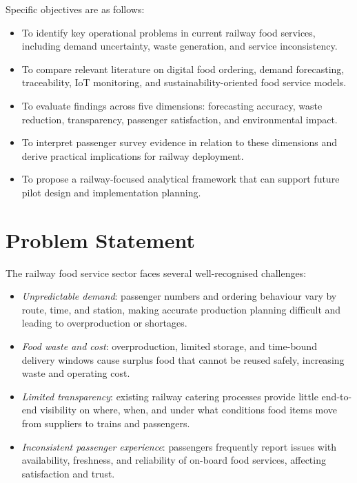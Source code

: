\documentclass[conference]{IEEEtran}
\begin{document}
Specific objectives are as follows:

\begin{itemize}[leftmargin=*]
\item To identify key operational problems in current railway food services, including demand uncertainty, waste generation, and service inconsistency.
\item To compare relevant literature on digital food ordering, demand forecasting, traceability, IoT monitoring, and sustainability-oriented food service models.
\item To evaluate findings across five dimensions: forecasting accuracy, waste reduction, transparency, passenger satisfaction, and environmental impact.
\item To interpret passenger survey evidence in relation to these dimensions and derive practical implications for railway deployment.
\item To propose a railway-focused analytical framework that can support future pilot design and implementation planning.
\end{itemize}

\section{Problem Statement}

The railway food service sector faces several well-recognised challenges:

\begin{itemize}[leftmargin=*]
\item \textit{Unpredictable demand}: passenger numbers and ordering behaviour vary by route, time, and station, making accurate production planning difficult and leading to overproduction or shortages.
\item \textit{Food waste and cost}: overproduction, limited storage, and time-bound delivery windows cause surplus food that cannot be reused safely, increasing waste and operating cost.
\item \textit{Limited transparency}: existing railway catering processes provide little end-to-end visibility on where, when, and under what conditions food items move from suppliers to trains and passengers.
\item \textit{Inconsistent passenger experience}: passengers frequently report issues with availability, freshness, and reliability of on-board food services, affecting satisfaction and trust.
\end{itemize}
\end{document}
